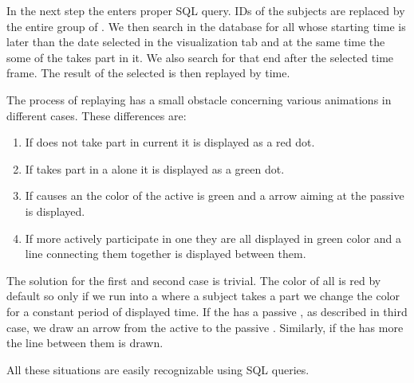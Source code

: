 In the next step the  enters proper SQL query. IDs of the subjects are replaced by the entire group of . We then search in the database for all  whose starting time is later than the date selected in the visualization tab and at the same time the some of the  takes part in it. We also search for    that end after the selected time frame. The result of the  selected   is then replayed by time. 

The process of replaying has a small obstacle concerning various animations in different cases. These differences are:
\begin{enumerate}
\item If  does not take part in current  it is displayed as a red dot.
\item If  takes part in a  alone it is displayed as a green dot.
\item If  causes an  the color of the active  is green and a arrow aiming at the passive  is displayed. 
\item If more  actively participate in one  they are all displayed in green color and a line connecting them together is displayed between them. 
\end{enumerate}

 The solution for the first and second case is trivial. The color of all  is red by default so only if we run into a  where a subject takes a part we change the color for a constant period of displayed time. If the  has a passive , as described in third case, we draw an arrow from the active to the passive . Similarly, if the  has more  the line between them is drawn.  
 
 All these situations are easily recognizable using SQL queries. 
% 
% 
% 
 
